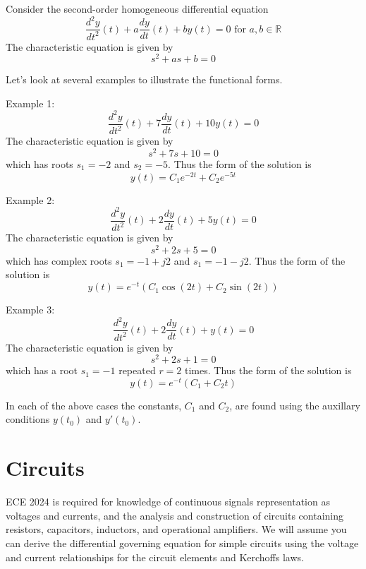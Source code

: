 Consider the second-order homogeneous differential equation
\[
\frac{d^2y}{dt^2}(t) + a\frac{dy}{dt}(t) + by(t) = 0 \mbox{ for } a,b \in \mathbb{R}
\]
The characteristic equation is given by
\[
s^2 + as + b = 0
\]

Let's look at several examples to illustrate the functional forms.

Example 1:
\[
\frac{d^2y}{dt^2}(t) + 7\frac{dy}{dt}(t) + 10y(t) = 0 
\]
The characteristic equation is given by
\[
s^2 + 7s + 10 = 0
\]
which has roots $s_1 = -2$ and $s_2 = -5$. Thus the form of the solution is
\[
y(t) = C_1e^{-2t} + C_2e^{-5t}
\]

Example 2:
\[
\frac{d^2y}{dt^2}(t) + 2\frac{dy}{dt}(t) + 5y(t) = 0 
\]
The characteristic equation is given by
\[
s^2 + 2s + 5 = 0
\]
which has complex roots $s_1 = -1+j2$ and $s_1 = -1-j2$. Thus the form of the solution is
\[
y(t) = e^{-t}\left(C_1\cos(2t) + C_2\sin(2t)\right)
\]

Example 3:
\[
\frac{d^2y}{dt^2}(t) + 2\frac{dy}{dt}(t) + y(t) = 0 
\]
The characteristic equation is given by
\[
s^2 + 2s + 1 = 0
\]
which has a root $s_1 = -1$ repeated $r=2$ times. Thus the form of the solution is
\[
y(t) = e^{-t}\left(C_1 + C_2t\right)
\]

In each of the above cases the constants, $C_1$ and $C_2$, are found using the auxillary conditions $y(t_0)$ and $y\prime(t_0)$.

\section{Circuits}

ECE 2024 is required for knowledge of continuous signals representation as voltages and currents, and the analysis and construction of circuits containing resistors, capacitors, inductors, and operational amplifiers. We will assume you can derive the differential governing equation for simple circuits using the voltage and current relationships for the circuit elements and Kerchoffs laws.

